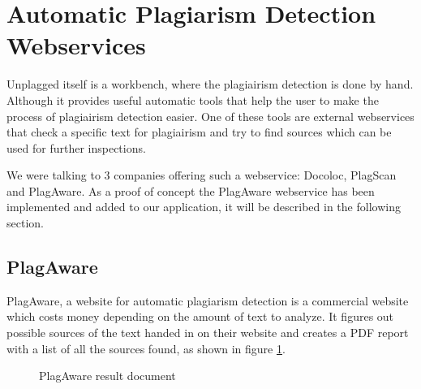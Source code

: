 \section{Automatic Plagiarism Detection Webservices}

Unplagged itself is a workbench, where the plagiairism detection is done by hand. Although it provides useful automatic tools that help the user to make the process of plagiairism detection easier. One of these tools are external webservices that check a specific text for plagiairism and try to find sources which can be used for further inspections.

We were talking to 3 companies offering such a webservice: Docoloc, PlagScan and PlagAware. As a proof of concept the PlagAware webservice has been implemented and added to our application, it will be described in the following section.

\subsection{PlagAware}

PlagAware, a website for automatic plagiarism detection is a commercial website which costs money depending on the amount of text to analyze. It figures out possible sources of the text handed in on their website and creates a PDF report with a list of all the sources found, as shown in figure \ref{fig:plagaware-result}.

\begin{figure}[!h]
  \centering
  \caption{PlagAware result document}
  \label{fig:plagaware-result}
\end{figure}

